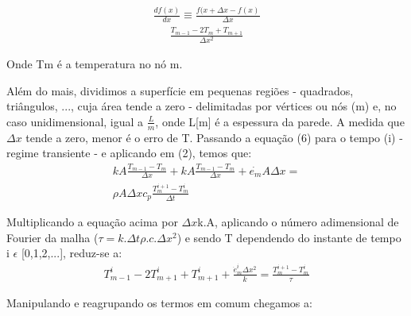 \documentclass[journal]{IEEEtran}
\begin{document}
        \begin{align}
            \frac{df(x)}{dx} \equiv \frac{f(x + \Delta x - f(x)}{\Delta x}
        \end{align}
        \begin{align}
            \frac{T_{m-1}-2T_m+T_{m+1}}{\Delta x^2}
        \end{align}
        \par Onde Tm  é a temperatura no nó m.
        \par Além do mais, dividimos a superfície em pequenas regiões - quadrados, triângulos, ..., cuja área tende a zero - delimitadas por vértices ou nós (m) e, no caso unidimensional, igual a $\frac{L}{m}$, onde L[m] é a espessura da parede. A medida que $\Delta x$ tende a zero, menor é o erro de T. Passando a equação (6) para o tempo (i) - regime transiente - e aplicando em (2), temos que:
        \begin{multline}
            kA\frac{T_{m-1}-T_m}{\Delta x} + kA\frac{T_{m-1}-T_m}{\Delta x} + \dot{e_m}A\Delta x = \\ \rho A \Delta xc_p\frac{T_{m}^{i+1} - T_{m}^i}{\Delta t}
        \end{multline}\cite[pp.293]{cengel}
        \par Multiplicando a equação acima por $\Delta x$k.A, aplicando o número adimensional de Fourier da malha ($\tau = k.\Delta t \rho.c.\Delta x^2$) e sendo T dependendo do instante de tempo i $\epsilon$ [0,1,2,...], reduz-se a:
		\begin{align}
			T_{m-1}^i - 2T_{m+1}^i + T_{m+1}^i + \frac{\dot{e}_m^i\Delta x^2}{k} = \frac{T_{m}^{i+1}  - T_m^i}{\tau}
		\end{align}
		\par Manipulando e reagrupando os termos em comum chegamos a:
		
\end{document}
